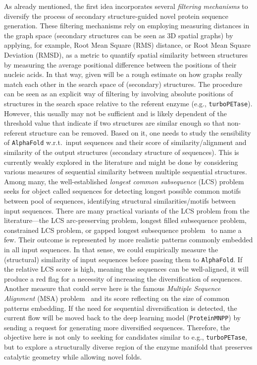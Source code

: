\documentclass[runningheads]{llncs}
\begin{document}
	As already mentioned, the first idea incorporates several \textit{filtering mechanisms} to diversify the process of   secondary structure-guided novel protein sequence generation.  These filtering mechanisms rely  on employing measuring distances in the graph space (secondary structures can be seen as 3D spatial graphs) by applying, for example, Root Mean Square (RMS) distance, or Root Mean Square Deviation (RMSD), as
	a metric to quantify spatial similarity between structures by measuring the average positional difference between the positions of their nucleic acids.  In that way, given will be a rough estimate on how graphs really match each other in the search space of (secondary) structures.  The procedure can be seen as an explicit way of filtering by involving absolute positions of structures in the search space relative to the referent enzyme (e.g., \texttt{turboPETase}). However, this usually may not be sufficient and is likely dependent of the threshold value that indicate if two structures are similar enough so that non-referent structure can be removed. Based on it, one needs to study the sensibility of \texttt{AlphaFold} w.r.t.\ input sequences and their score of similarity/alignment and similarity of the output structures (secondary structure of sequences). This is currently weakly explored in the literature and might be done by considering various measures of sequential similarity between multiple sequential structures. Among many, the well-established \textit{longest common subsequence} (LCS) problem~\cite{djukanovic2019beam} seeks for object called sequences for detecting longest possible common motifs between pool of sequences, identifying  structural similarities/motifs between input sequences. There are many practical variants of the LCS problem from the literature---the LCS arc-preserving problem, longest filled subsequence problem, constrained LCS problem, or gapped longest subsequence problem~\cite{lin2002longest,castelli2017longest,chen2011generalized} to name a few. Their outcome is represented by more realistic patterns commonly embedded in all input sequences. In that sense, we could empirically measure the (structural) similarity of input sequences before passing them to \texttt{AlphaFold}. If the relative LCS score is high, meaning the sequences can be well-aligned, it will produce a red flag for a necessity of increasing the diversification of sequences. Another measure that could serve here is the famous \textit{Multiple Sequence Alignment} (MSA) problem~\cite{katoh2008recent,chatzou2016multiple} and its score reflecting on the size of common patterns embedding. If the need for sequential diversification is detected, the current flow will be moved back to the deep learning model (\texttt{ProteinMNPP}) by sending a request for generating more diversified sequences. Therefore, the objective here is not only to seeking for candidates similar to e.g., \texttt{turboPETase}, but to explore a structurally diverse region of the enzyme manifold that preserves catalytic geometry while allowing novel folds.
	
\end{document}
